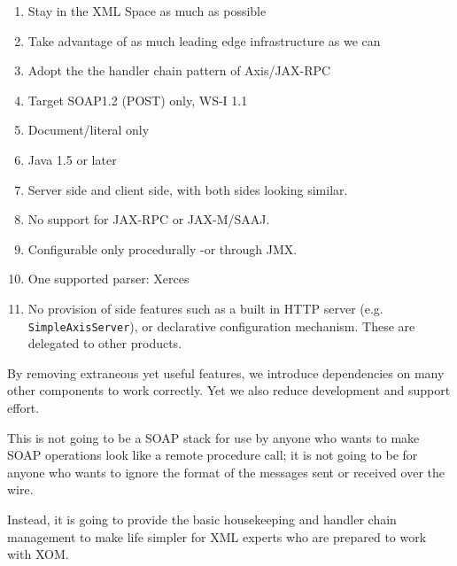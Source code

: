 \begin{enumerate}

\item Stay in the XML Space as much as possible
\item Take advantage of as much leading edge infrastructure as we can
\item Adopt the the handler chain pattern of Axis/JAX-RPC
\item Target SOAP1.2 (POST) only, WS-I 1.1
\item Document/literal only
\item Java 1.5 or later 
\item Server side and client side, with both sides looking similar. 
\item No support for JAX-RPC or JAX-M/SAAJ.
\item Configurable only procedurally -or through JMX. 
\item One supported parser: Xerces

\item No provision of side features such as a built in HTTP server (e.g.
\verb|SimpleAxisServer|), or declarative configuration mechanism.
These are delegated to other products.
\end{enumerate}

By removing extraneous yet useful features, we introduce dependencies
on many other components to work correctly. Yet we also reduce
development and support effort.

This is not going to be a SOAP stack for use by anyone who wants to
make SOAP operations look like a remote procedure call; it is not
going to be for anyone who wants to ignore the format of the messages
sent or received over the wire.

Instead, it is going to provide the basic housekeeping and handler
chain management to make life simpler for XML experts who are prepared
to work with XOM.
